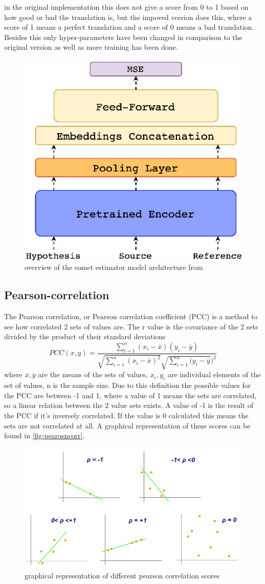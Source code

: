 in the original implementation this does not give a score from 0 to 1 based on how good or bad the translation is, but the impoved version does this, where a score of 1 means a perfect translation and a score of 0 means a bad translation. Besides this only hyper-parameters have been changed in comparison to the original version as well as more training has been done.
\begin{figure}[ht]
    \centering
    \includegraphics[width=0.3\linewidth]{Latex//sections//images/cometestimatormodel.png}
    \caption{overview of the comet estimator model architecture from \cite{rei-etal-2020-comet}}
    \label{comet architecture}
\end{figure}


\subsection{Pearson-correlation}
The Pearson correlation, or Pearson correlation coefficient (PCC) is a method to see how correlated 2 sets of values are. The r value is the covariance of the 2 sets divided by the product of their standard deviations $$PCC(x,y) =\frac{\sum_{i=1}^n (x_i-\overline{x})(y_i-\overline{y})}{\sqrt{\sum_{i=1}^n (x_i-\overline{x})^2}\sqrt{\sum_{i=1}^n(y_i-\overline{y}})^2}$$ where $\overline{x},  \overline{y}$ are the means of the sets of values, $x_i, y_i$ are individual elements of the set of values, n is the sample size. 
Due to this definition the possible values for the PCC are between -1 and 1, where a value of 1 means the sets are correlated, so a linear relation between the 2 value sets exists. A value of -1 is the result of the PCC if it's inversely correlated. 
If the value is 0 calculated this means the sets are not correlated at all. A graphical representation of these scores can be found in \autoref{fig:pearosncorr}. \cite{pearsoncorr}
\begin{figure}[ht]
    \centering
    \includegraphics[width=0.7\linewidth]{Latex//sections//images/pearson correlation.png}
    \caption{graphical representation of different pearson correlation scores \cite{pearsoncorrimage}}
    
    \label{fig:pearosncorr}
\end{figure}

